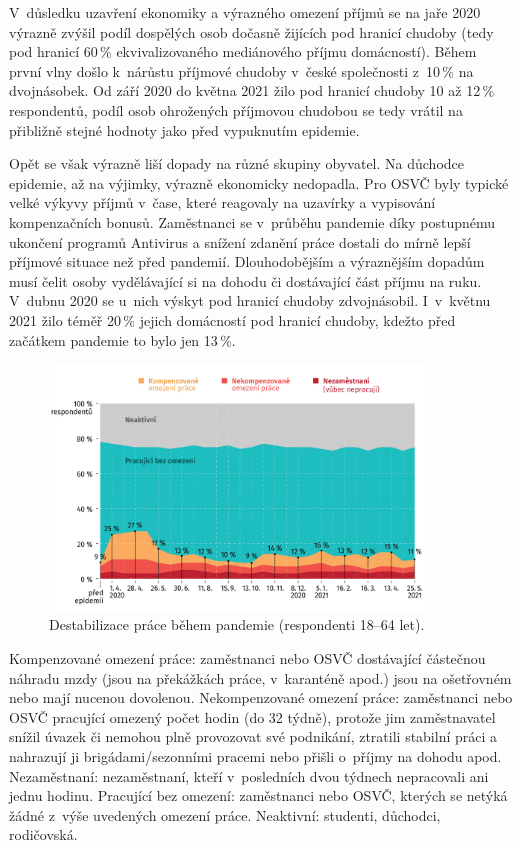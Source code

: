 V důsledku uzavření ekonomiky a výrazného omezení příjmů se na jaře 2020 výrazně zvýšil podíl dospělých osob dočasně žijících pod hranicí chudoby (tedy pod hranicí 60\,\% ekvivalizovaného mediánového příjmu domácností). Během první vlny došlo k nárůstu
příjmové chudoby v české společnosti z 10\,\% na dvojnásobek. Od září 2020 do května 2021 žilo pod hranicí chudoby 10 až 12\,\% respondentů, podíl osob ohrožených příjmovou chudobou se tedy vrátil na přibližně stejné hodnoty jako před vypuknutím epidemie.

Opět se však výrazně liší dopady na různé skupiny obyvatel. Na důchodce epidemie, až na výjimky, výrazně ekonomicky nedopadla. Pro OSVČ byly typické velké výkyvy příjmů v čase, které reagovaly na uzavírky a vypisování kompenzačních bonusů. Zaměstnanci se v průběhu pandemie díky postupnému ukončení programů Antivirus a snížení zdanění práce dostali do mírně lepší příjmové situace než před pandemií. Dlouhodobějším a výraznějším dopadům musí čelit osoby vydělávající si na dohodu či dostávající část příjmu na ruku. V dubnu 2020 se u~nich výskyt pod hranicí chudoby zdvojnásobil. I~v květnu 2021 žilo téměř 20\,\% jejich domácností pod hranicí chudoby, kdežto před začátkem pandemie to bylo jen 13\,\%.


\begin{figure}[ht]
    \centering
    \includegraphics[width=0.9\textwidth]{./pic/zbp-graf1.png}
    \caption{Destabilizace práce během pandemie (respondenti 18--64 let).}
    \label{fig:zbp1}
\end{figure}

Kompenzované omezení práce: zaměstnanci nebo OSVČ dostávající částečnou náhradu mzdy (jsou na překážkách práce, v~karanténě apod.) jsou na ošetřovném nebo mají nucenou dovolenou. Nekompenzované omezení práce: zaměstnanci nebo OSVČ pracující omezený počet hodin (do 32 týdně), protože jim zaměstnavatel snížil úvazek či nemohou plně provozovat své podnikání, ztratili stabilní práci a nahrazují ji brigádami/sezonními pracemi nebo přišli o~příjmy na dohodu apod. Nezaměstnaní: nezaměstnaní, kteří v~posledních dvou týdnech nepracovali ani jednu hodinu. Pracující bez omezení: zaměstnanci nebo OSVČ, kterých se netýká žádné z~výše uvedených omezení práce. Neaktivní: studenti, důchodci, rodičovská.

